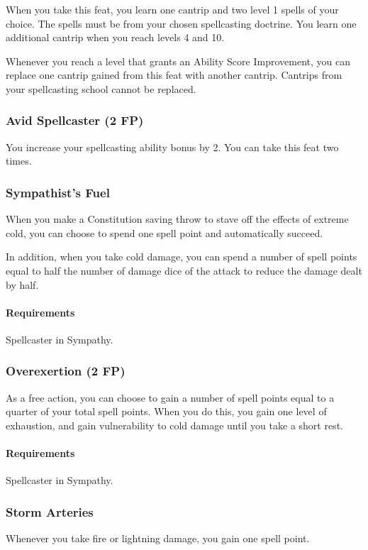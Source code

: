     When you take this feat, you learn one cantrip and two level 1 spells of your choice.
    The spells must be from your chosen spellcasting doctrine.
    You learn one additional cantrip when you reach levels 4 and 10.

    Whenever you reach a level that grants an Ability Score Improvement, you can replace one cantrip gained from this feat with another cantrip.
    Cantrips from your spellcasting school cannot be replaced.
\subsubsection{Avid Spellcaster (2 FP)} \label{feat::avidspellcaster}
    You increase your spellcasting ability bonus by 2.
    You can take this feat two times.
\subsubsection{Sympathist's Fuel} \label{feat::sympathistsfuel}
    When you make a Constitution saving throw to stave off the effects of extreme cold, you can choose to spend one spell point and automatically succeed.

    In addition, when you take cold damage, you can spend a number of spell points equal to half the number of damage dice of the attack to reduce the damage dealt by half.
    \paragraph{Requirements} Spellcaster in Sympathy.
\subsubsection{Overexertion (2 FP)} \label{feat::overexertion}
    As a free action, you can choose to gain a number of spell points equal to a quarter of your total spell points.
    When you do this, you gain one level of exhaustion, and gain vulnerability to cold damage until you take a short rest.
    \paragraph{Requirements} Spellcaster in Sympathy.
\subsubsection{Storm Arteries} \label{feat::stormarteries}
    Whenever you take fire or lightning damage, you gain one spell point.
